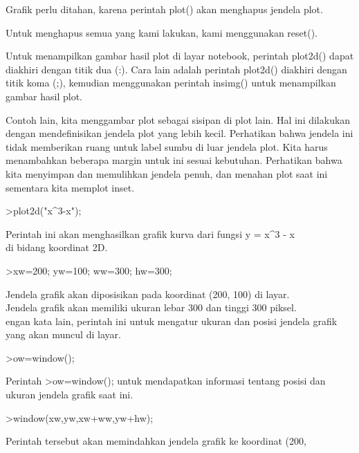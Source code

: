 \documentclass{article}
\begin{document}
\begin{eulernotebook}
\begin{eulercomment}
Grafik perlu ditahan, karena perintah plot() akan menghapus jendela
plot.

Untuk menghapus semua yang kami lakukan, kami menggunakan reset().

Untuk menampilkan gambar hasil plot di layar notebook, perintah
plot2d() dapat diakhiri dengan titik dua (:). Cara lain adalah
perintah plot2d() diakhiri dengan titik koma (;), kemudian menggunakan
perintah insimg() untuk menampilkan gambar hasil plot.

Contoh lain, kita menggambar plot sebagai sisipan di plot lain. Hal
ini dilakukan dengan mendefinisikan jendela plot yang lebih kecil.
Perhatikan bahwa jendela ini tidak memberikan ruang untuk label sumbu
di luar jendela plot. Kita harus menambahkan beberapa margin untuk ini
sesuai kebutuhan. Perhatikan bahwa kita menyimpan dan memulihkan
jendela penuh, dan menahan plot saat ini sementara kita memplot inset.
\end{eulercomment}
\begin{eulerprompt}
>plot2d("x^3-x");
\end{eulerprompt}
\begin{eulercomment}
Perintah ini akan menghasilkan grafik kurva dari fungsi y = x\textasciicircum{}3 - x\\
di bidang koordinat 2D.
\end{eulercomment}
\begin{eulerprompt}
>xw=200; yw=100; ww=300; hw=300;
\end{eulerprompt}
\begin{eulercomment}
Jendela grafik akan diposisikan pada koordinat (200, 100) di layar.\\
Jendela grafik akan memiliki ukuran lebar 300 dan tinggi 300 piksel.\\
engan kata lain, perintah ini untuk mengatur ukuran dan posisi jendela
grafik yang akan muncul di layar.
\end{eulercomment}
\begin{eulerprompt}
>ow=window();
\end{eulerprompt}
\begin{eulercomment}
Perintah \textgreater{}ow=window(); untuk mendapatkan informasi tentang posisi dan
ukuran jendela grafik saat ini.
\end{eulercomment}
\begin{eulerprompt}
>window(xw,yw,xw+ww,yw+hw);
\end{eulerprompt}
\begin{eulercomment}
Perintah tersebut akan memindahkan jendela grafik ke koordinat (200,

\end{eulercomment}
\end{eulernotebook}
\end{document}
